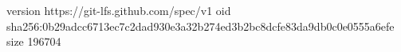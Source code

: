 version https://git-lfs.github.com/spec/v1
oid sha256:0b29adcc6713ec7c2dad930e3a32b274ed3b2bc8dcfe83da9db0c0e0555a6efe
size 196704
